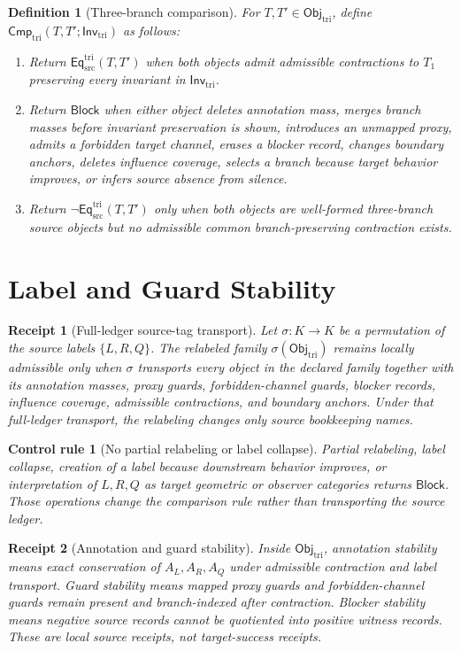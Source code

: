 \documentclass[11pt]{article}
\newcommand{\EqTri}{\mathsf{Eq}_{\mathrm{src}}^{\mathrm{tri}}}
\newcommand{\ObjTri}{\mathsf{Obj}_{\mathrm{tri}}}
\newcommand{\InvTri}{\mathsf{Inv}_{\mathrm{tri}}}
\newcommand{\CmpTri}{\mathsf{Cmp}_{\mathrm{tri}}}
\newcommand{\Block}{\mathsf{Block}}
\newtheorem{definitionblock}{Definition}
\newtheorem{receipt}{Receipt}
\newtheorem{controlrule}{Control rule}
\begin{document}
\begin{definitionblock}[Three-branch comparison]
For \(T,T'\in\ObjTri\), define \(\CmpTri(T,T';\InvTri)\) as follows:
\begin{enumerate}
    \item Return \(\EqTri(T,T')\) when both objects admit admissible
    contractions to \(T_{1}\) preserving every invariant in \(\InvTri\).
    \item Return \(\Block\) when either object deletes annotation mass,
    merges branch masses before invariant preservation is shown,
    introduces an unmapped proxy, admits a forbidden target channel,
    erases a blocker record, changes boundary anchors, deletes influence
    coverage, selects a branch because target behavior improves, or
    infers source absence from silence.
    \item Return \(\neg\EqTri(T,T')\) only when both objects are
    well-formed three-branch source objects but no admissible common
    branch-preserving contraction exists.
\end{enumerate}
\end{definitionblock}

\section{Label and Guard Stability}

\begin{receipt}[Full-ledger source-tag transport]
Let \(\sigma:K\to K\) be a permutation of the source labels
\(\{L,R,Q\}\). The relabeled family \(\sigma(\ObjTri)\) remains locally
admissible only when \(\sigma\) transports every object in the declared
family together with its annotation masses, proxy guards,
forbidden-channel guards, blocker records, influence coverage,
admissible contractions, and boundary anchors. Under that full-ledger
transport, the relabeling changes only source bookkeeping names.
\end{receipt}

\begin{controlrule}[No partial relabeling or label collapse]
Partial relabeling, label collapse, creation of a label because
downstream behavior improves, or interpretation of \(L,R,Q\) as target
geometric or observer categories returns \(\Block\). Those operations
change the comparison rule rather than transporting the source ledger.
\end{controlrule}

\begin{receipt}[Annotation and guard stability]
Inside \(\ObjTri\), annotation stability means exact conservation of
\(A_{L},A_{R},A_{Q}\) under admissible contraction and label transport.
Guard stability means mapped proxy guards and forbidden-channel guards
remain present and branch-indexed after contraction. Blocker stability
means negative source records cannot be quotiented into positive witness
records. These are local source receipts, not target-success receipts.
\end{receipt}
\end{document}
